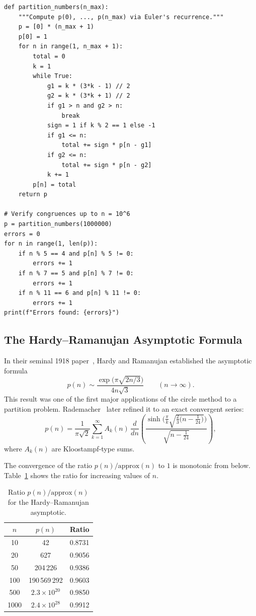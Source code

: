 \documentclass[10pt]{amsart}
\theoremstyle{plain}
\theoremstyle{definition}
\theoremstyle{remark}
\begin{document}
\begin{lstlisting}
def partition_numbers(n_max):
    """Compute p(0), ..., p(n_max) via Euler's recurrence."""
    p = [0] * (n_max + 1)
    p[0] = 1
    for n in range(1, n_max + 1):
        total = 0
        k = 1
        while True:
            g1 = k * (3*k - 1) // 2
            g2 = k * (3*k + 1) // 2
            if g1 > n and g2 > n:
                break
            sign = 1 if k % 2 == 1 else -1
            if g1 <= n:
                total += sign * p[n - g1]
            if g2 <= n:
                total += sign * p[n - g2]
            k += 1
        p[n] = total
    return p

# Verify congruences up to n = 10^6
p = partition_numbers(1000000)
errors = 0
for n in range(1, len(p)):
    if n % 5 == 4 and p[n] % 5 != 0:
        errors += 1
    if n % 7 == 5 and p[n] % 7 != 0:
        errors += 1
    if n % 11 == 6 and p[n] % 11 != 0:
        errors += 1
print(f"Errors found: {errors}")
\end{lstlisting}

\subsection{The Hardy--Ramanujan Asymptotic Formula}

In their seminal 1918 paper~\cite{hardy_ramanujan_1918}, Hardy and
Ramanujan established the asymptotic formula
\begin{equation}
\label{eq:hr_asymptotic}
p(n) \sim \frac{\exp\!\bigl(\pi\sqrt{2n/3}\bigr)}{4n\sqrt{3}}
\qquad (n \to \infty).
\end{equation}
This result was one of the first major applications of the circle
method to a partition problem. Rademacher~\cite{rademacher_1937} later
refined it to an exact convergent series:
\begin{equation}
\label{eq:rademacher}
p(n) = \frac{1}{\pi\sqrt{2}} \sum_{k=1}^{\infty} A_k(n) \,
\frac{d}{dn}\left(\frac{\sinh\!\bigl(\frac{\pi}{k}\sqrt{\frac{2}{3}\bigl(n-\frac{1}{24}\bigr)}\bigr)}
{\sqrt{n-\frac{1}{24}}}\right),
\end{equation}
where $A_k(n)$ are Kloostampf-type sums.

The convergence of the ratio $p(n)/\text{approx}(n)$ to $1$ is
monotonic from below. Table~\ref{tab:asymptotic} shows the ratio for
increasing values of $n$.

\begin{table}
\caption{Ratio $p(n)/\text{approx}(n)$ for the Hardy--Ramanujan asymptotic.}
\label{tab:asymptotic}
\begin{tabular}{ccc}
\toprule
$n$ & $p(n)$ & Ratio \\
\midrule
10 & 42 & 0.8731 \\
20 & 627 & 0.9056 \\
50 & 204\,226 & 0.9386 \\
100 & 190\,569\,292 & 0.9603 \\
500 & $2.3 \times 10^{20}$ & 0.9850 \\
1000 & $2.4 \times 10^{28}$ & 0.9912 \\
\bottomrule
\end{tabular}
\end{table}
\end{document}
